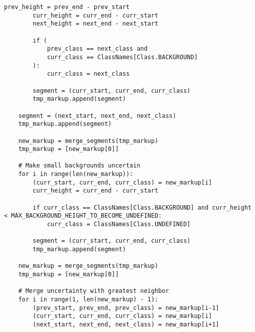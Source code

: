 \begin{lstlisting}[caption={Функция создания объединенной разметки (часть 2)}, label={lst:}]
        prev_height = prev_end - prev_start
        curr_height = curr_end - curr_start
        next_height = next_end - next_start

        if (
            prev_class == next_class and
            curr_class == ClassNames[Class.BACKGROUND]
        ):
            curr_class = next_class

        segment = (curr_start, curr_end, curr_class)
        tmp_markup.append(segment)

    segment = (next_start, next_end, next_class)
    tmp_markup.append(segment)

    new_markup = merge_segments(tmp_markup)
    tmp_markup = [new_markup[0]]

    # Make small backgrounds uncertain
    for i in range(len(new_markup)):
        (curr_start, curr_end, curr_class) = new_markup[i]
        curr_height = curr_end - curr_start

        if curr_class == ClassNames[Class.BACKGROUND] and curr_height < MAX_BACKGROUND_HEIGHT_TO_BECOME_UNDEFINED:
            curr_class = ClassNames[Class.UNDEFINED]

        segment = (curr_start, curr_end, curr_class)
        tmp_markup.append(segment)

    new_markup = merge_segments(tmp_markup)
    tmp_markup = [new_markup[0]]

    # Merge uncertainty with greatest neighbor
    for i in range(1, len(new_markup) - 1):
        (prev_start, prev_end, prev_class) = new_markup[i-1]
        (curr_start, curr_end, curr_class) = new_markup[i]
        (next_start, next_end, next_class) = new_markup[i+1]
\end{lstlisting}

\newpage

